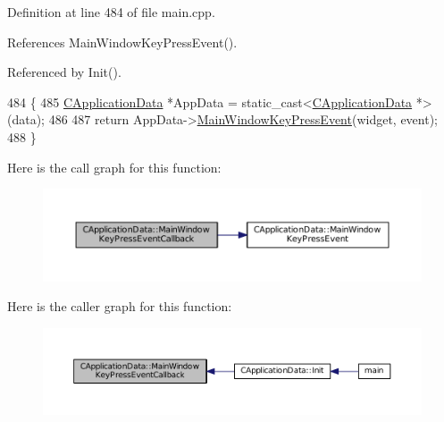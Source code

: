 Definition at line 484 of file main.\+cpp.



References Main\+Window\+Key\+Press\+Event().



Referenced by Init().


\begin{DoxyCode}
484                                                                                                            
         \{
485     \hyperlink{classCApplicationData}{CApplicationData} *AppData = \textcolor{keyword}{static\_cast<}\hyperlink{classCApplicationData}{CApplicationData} *\textcolor{keyword}{>}(data);
486 
487     \textcolor{keywordflow}{return} AppData->\hyperlink{classCApplicationData_a9b451765c93ecf00322f5450d29bfffe}{MainWindowKeyPressEvent}(widget, event);
488 \}
\end{DoxyCode}
Here is the call graph for this function\+:\nopagebreak
\begin{figure}[H]
\begin{center}
\leavevmode
\includegraphics[width=350pt]{classCApplicationData_aca6cce5b1cd5142984d2880294ff6ed4_cgraph}
\end{center}
\end{figure}
Here is the caller graph for this function\+:\nopagebreak
\begin{figure}[H]
\begin{center}
\leavevmode
\includegraphics[width=350pt]{classCApplicationData_aca6cce5b1cd5142984d2880294ff6ed4_icgraph}
\end{center}
\end{figure}
\hypertarget{classCApplicationData_aff9f46bccd458a0dcca968e4a46c7d9b}{}\label{classCApplicationData_aff9f46bccd458a0dcca968e4a46c7d9b} 
